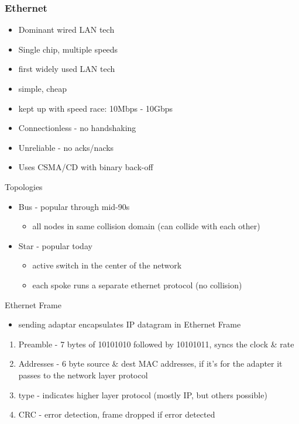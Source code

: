 \documentclass{article}
\begin{document}
\subsubsection*{Ethernet}

\begin{itemize}
	\item Dominant wired LAN tech
	\item Single chip, multiple speeds
	\item first widely used LAN tech
	\item simple, cheap
	\item kept up with speed race: 10Mbps - 10Gbps
	\item Connectionless - no handshaking
	\item Unreliable - no acks/nacks
	\item Uses CSMA/CD with binary back-off
\end{itemize}

\noindent Topologies
\begin{itemize}
	\item Bus - popular through mid-90s
	\begin{itemize}
		\item all nodes in same collision domain (can collide with each other)
	\end{itemize}
	\item Star - popular today
	\begin{itemize}
		\item active switch in the center of the network
		\item each spoke runs a separate ethernet protocol (no collision)
	\end{itemize}
\end{itemize}

\noindent Ethernet Frame
\begin{itemize}
	\item sending adaptar encapsulates IP datagram in Ethernet Frame
\end{itemize}
\begin{enumerate}
	\item Preamble - 7 bytes of 10101010 followed by 10101011, syncs the clock \& rate
	\item Addresses - 6 byte source \& dest MAC addresses, if it's for the adapter it passes to the network layer protocol
	\item type - indicates higher layer protocol (mostly IP, but others possible)
	\item CRC - error detection, frame dropped if error detected
\end{enumerate}
\end{document}
